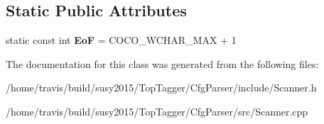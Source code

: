 \subsection*{Static Public Attributes}
\begin{DoxyCompactItemize}
\item 
\hypertarget{classhcalcfg_1_1Buffer_a2797e70d809eb3b5650edb732d6584d0}{static const int {\bfseries Eo\-F} = C\-O\-C\-O\-\_\-\-W\-C\-H\-A\-R\-\_\-\-M\-A\-X + 1}\label{classhcalcfg_1_1Buffer_a2797e70d809eb3b5650edb732d6584d0}

\end{DoxyCompactItemize}


The documentation for this class was generated from the following files\-:\begin{DoxyCompactItemize}
\item 
/home/travis/build/susy2015/\-Top\-Tagger/\-Cfg\-Parser/include/Scanner.\-h\item 
/home/travis/build/susy2015/\-Top\-Tagger/\-Cfg\-Parser/src/Scanner.\-cpp\end{DoxyCompactItemize}
